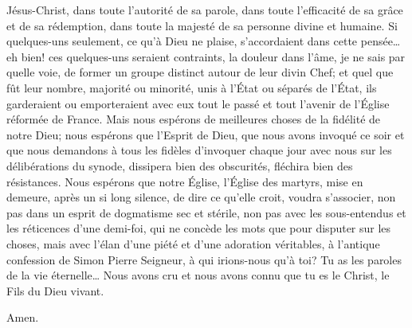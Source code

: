 Jésus-Christ, dans toute l’autorité de sa parole, dans toute l’efficacité de sa grâce et de sa rédemption,
dans toute la majesté de sa personne divine et humaine.
Si quelques-uns seulement, ce qu’à Dieu ne plaise, s’accordaient dans cette pensée… eh bien! ces quelques-uns seraient contraints,
la douleur dans l’âme, je ne sais par quelle voie, de former un groupe distinct autour de leur divin Chef;
et quel que fût leur nombre, majorité ou minorité, unis à l’État ou séparés de l’État,
ils garderaient ou emporteraient avec eux tout le passé et tout l’avenir de l’Église réformée de France.
Mais nous espérons de meilleures choses de la fidélité de notre Dieu; nous espérons que l’Esprit de Dieu,
que nous avons invoqué ce soir et que nous demandons à tous les fidèles d’invoquer chaque jour avec nous
sur les délibérations du synode, dissipera bien des obscurités, fléchira bien des résistances.
Nous espérons que notre Église, l’Église des martyrs, mise en demeure, après un si long silence,
de dire ce qu’elle croit, voudra s’associer, non pas dans un esprit de dogmatisme sec et stérile,
non pas avec les sous-entendus et les réticences d’une demi-foi, qui ne concède les mots que pour disputer sur les choses,
mais avec l’élan d’une piété et d’une adoration véritables, à l’antique confession de Simon Pierre\frcolon{}
\Og{} Seigneur, à qui irions-nous qu’à toi? Tu as les paroles de la vie éternelle…
Nous avons cru et nous avons connu que tu es le Christ, le Fils du Dieu vivant. \Fg{}

\hfill Amen.


\thispagestyle{chapterend}
